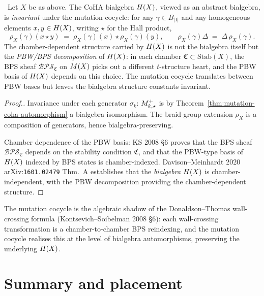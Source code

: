 \begin{corollary}
\label{cor:chamber-independence}
\ClaimStatusTheorem\ Let $X$ be as above. The CoHA bialgebra $H(X)$,
viewed as an abstract bialgebra, is \emph{invariant} under the mutation
cocycle: for any $\gamma \in B_{|I|}$ and any homogeneous elements $x, y
\in H(X)$, writing $\star$ for the Hall product,
\[
  \rho_X(\gamma)(x \star y) \;=\; \rho_X(\gamma)(x) \star \rho_X(\gamma)(y),
  \qquad
  \rho_X(\gamma) \Delta \;=\; \Delta\, \rho_X(\gamma).
\]
The chamber-dependent structure carried by $H(X)$ is not the bialgebra
itself but the \emph{PBW/BPS decomposition} of $H(X)$: in each chamber
$\mathfrak{C} \subset \mathrm{Stab}(X)$, the BPS sheaf
$\mathcal{BPS}_{\mathfrak{C}}$ on $M(X)$ picks out a different
$t$-structure heart, and the PBW basis of $H(X)$ depends on this choice.
The mutation cocycle translates between PBW bases but leaves the bialgebra
structure constants invariant.
\end{corollary}

\begin{proof}[Proof.]
Invariance under each generator $\sigma_k$: $M_{k,\star}^{+}$ is by
Theorem~\ref{thm:mutation-coha-automorphism} a bialgebra isomorphism. The
braid-group extension $\rho_X$ is a composition of generators, hence
bialgebra-preserving.

Chamber dependence of the PBW basis: KS 2008 \S6 proves that the BPS sheaf
$\mathcal{BPS}_{\mathfrak{C}}$ depends on the stability condition
$\mathfrak{C}$, and that the PBW-type basis of $H(X)$ indexed by
BPS states is chamber-indexed. Davison--Meinhardt 2020
arXiv:\texttt{1601.02479} Thm.~A establishes that the \emph{bialgebra}
$H(X)$ is chamber-independent, with the PBW decomposition providing the
chamber-dependent structure.
\end{proof}

The mutation cocycle is the algebraic shadow of the Donaldson--Thomas
wall-crossing formula (Kontsevich--Soibelman 2008 \S6): each wall-crossing
transformation is a chamber-to-chamber BPS reindexing, and the mutation
cocycle realises this at the level of bialgebra automorphisms, preserving
the underlying $H(X)$.

\section*{Summary and placement}

